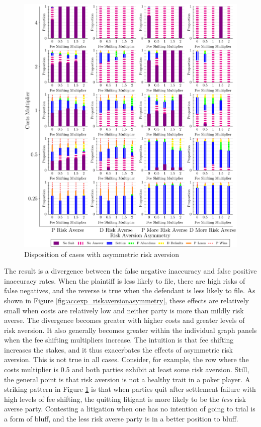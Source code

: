 \documentclass{article}
\begin{document}
\begin{figure}[h!]
\centering
\includegraphics[scale=0.50, trim={0in 0in 0in 0in}, clip]{../Figures/Disposition Varying Risk Aversion Asymmetry.pdf}
\caption{Disposition of cases with asymmetric risk aversion}
\label{fig:disposition_riskaversionasymmetry}
\end{figure}

The result is a divergence between the false negative inaccuracy and false positive inaccuracy rates. When the plaintiff is less likely to file, there are high risks of false negatives, and the reverse is true when the defendant is less likely to file. As shown in Figure \ref{fig:accexp_riskaversionasymmetry}, these effects are relatively small when costs are relatively low and neither party is more than mildly risk averse. The divergence becomes greater with higher costs and greater levels of risk aversion. It also generally becomes greater within the individual graph panels when the fee shifting multipliers increase. The intuition is that fee shifting increases the stakes, and it thus exacerbates the effects of asymmetric risk aversion. This is not true in all cases. Consider, for example, the row where the costs multiplier is 0.5 and both parties exhibit at least some risk aversion. Still, the general point is that risk aversion is not a healthy trait in a poker player. A striking pattern in Figure \ref{fig:disposition_riskaversionasymmetry} is that when parties quit after settlement failure with high levels of fee shifting, the quitting litigant is more likely to be the \textit{less} risk averse party. Contesting a litigation when one has no intention of going to trial is a form of bluff, and the less risk averse party is in a better position to bluff. 
\end{document}
